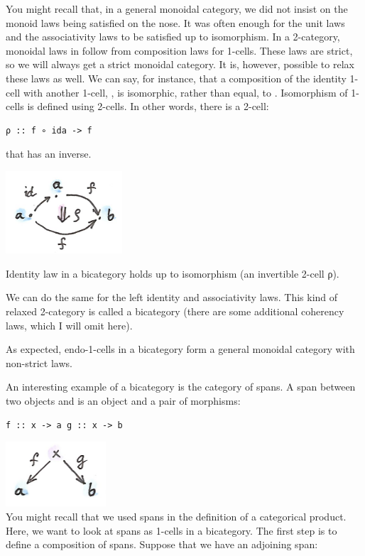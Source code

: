 You might recall that, in a general monoidal category, we did not insist
on the monoid laws being satisfied on the nose. It was often enough for
the unit laws and the associativity laws to be satisfied up to
isomorphism. In a 2-category, monoidal laws in  follow
from composition laws for 1-cells. These laws are strict, so we will
always get a strict monoidal category. It is, however, possible to relax
these laws as well. We can say, for instance, that a composition of the
identity 1-cell  with another 1-cell,
, is isomorphic, rather than equal,
to . Isomorphism of 1-cells is defined using 2-cells. In other
words, there is a 2-cell:

\begin{verbatim}
ρ :: f ∘ ida -> f
\end{verbatim}

that has an inverse.

\hypertarget{attachment_9107}{}
\includegraphics[width=1.70833in]{images/bicat.png}

Identity law in a bicategory holds up to isomorphism (an invertible
2-cell ρ).

We can do the same for the left identity and associativity laws. This
kind of relaxed 2-category is called a bicategory (there are some
additional coherency laws, which I will omit here).

As expected, endo-1-cells in a bicategory form a general monoidal
category with non-strict laws.

An interesting example of a bicategory is the category of spans. A span
between two objects  and  is an object 
and a pair of morphisms:

\begin{verbatim}
f :: x -> a g :: x -> b
\end{verbatim}

\includegraphics[width=1.46875in]{images/span.png}\\
You might recall that we used spans in the definition of a categorical
product. Here, we want to look at spans as 1-cells in a bicategory. The
first step is to define a composition of spans. Suppose that we have an
adjoining span:


